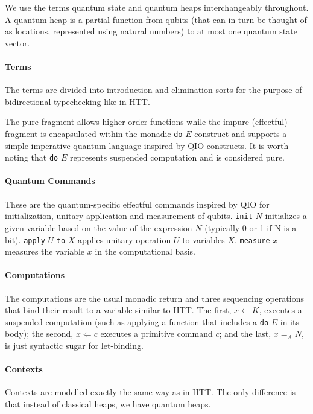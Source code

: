 \documentclass[acmsmall,nonacm,timestamp,review=false,anonymous=false]{acmart}
\newcommand{\kw}[1]{\,\mathrm{\texttt{#1}}\,}
\begin{document}
We use the terms quantum state and quantum heaps interchangeably throughout. A quantum heap is a partial function from qubits (that can in turn be thought of as locations, represented using natural numbers) to at most one quantum state vector.


\paragraph{Terms}
The terms are divided into introduction and elimination sorts for the purpose of bidirectional typechecking like in HTT.

The pure fragment allows higher-order functions while the impure (effectful) fragment is encapsulated within the monadic \texttt{do} $E$ construct and supports a simple imperative quantum language inspired by QIO constructs. It is worth noting that \texttt{do} $E$ represents suspended computation and is considered pure.

\paragraph{Quantum Commands}
These are the quantum-specific effectful commands inspired by QIO for initialization, unitary application and measurement of qubits.
\texttt{init} $N$ initializes a given variable based on the value of the expression $N$ (typically 0 or 1 if N is a bit).
\texttt{apply} $U$ \texttt{to} $X$ applies unitary operation $U$ to variables $X$.
\texttt{measure} $x$ measures the variable $x$ in the computational basis.

\paragraph{Computations} The computations are the usual monadic return and three sequencing operations that bind their result to a variable similar to HTT. The first, $x \leftarrow K$, executes a suspended computation (such as applying a function that includes a \texttt{do} $E$ in its body); the second, $x \Leftarrow c$ executes a primitive command $c$; and the last, $x =_A N$, is just syntactic sugar for let-binding.

\paragraph{Contexts} Contexts are modelled exactly the same way as in HTT. The only difference is that instead of classical heaps, we have quantum heaps.
\end{document}
